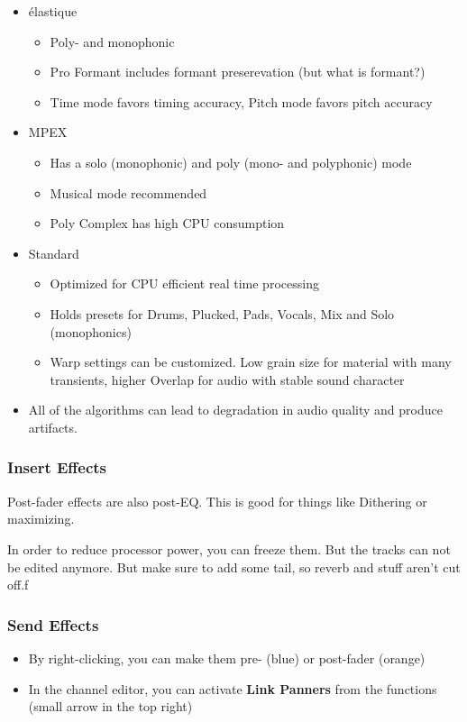 \documentclass[10pt]{article}
\begin{document}
\begin{itemize}
	\item élastique
	\begin{itemize}
		\item Poly- and monophonic
		\item Pro Formant includes formant preserevation (but what is formant?)
		\item Time mode favors timing accuracy, Pitch mode favors pitch accuracy
	\end{itemize}
	\item MPEX
	\begin{itemize}
		\item Has a solo (monophonic) and poly (mono- and polyphonic) mode
		\item Musical mode recommended
		\item Poly Complex has high CPU consumption
	\end{itemize}
	\item Standard
	\begin{itemize}
		\item Optimized for CPU efficient real time processing
		\item Holds presets for Drums, Plucked, Pads, Vocals, Mix and Solo (monophonics)
		\item Warp settings can  be customized. Low grain size for material with many transients, higher Overlap for audio with stable sound character
	\end{itemize}
	\item All of the algorithms can lead to degradation in audio quality and produce artifacts.
\end{itemize}

\subsubsection{Insert Effects}

Post-fader effects are also post-EQ. This is good for things like Dithering or maximizing.

In order to reduce processor power, you can freeze them. But the tracks can not be edited anymore. But make sure to add some tail, so reverb and stuff aren't cut off.f

\subsubsection{Send Effects}

\begin{itemize}
	\item By right-clicking, you can make them pre- (blue) or post-fader (orange)
	\item In the channel editor, you can activate \textbf{Link Panners} from the functions (small arrow in the top right)
\end{itemize}
\end{document}

